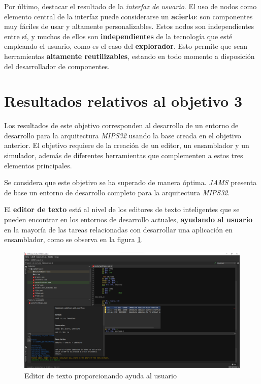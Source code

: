 Por último, destacar el resultado de la \textit{interfaz de usuario}.
El uso de nodos como elemento central de la interfaz puede considerarse
un \textbf{acierto}: son componentes muy fáciles de usar y altamente personalizables.
Estos nodos son independientes entre sí, y muchos de ellos son \textbf{independientes}
de la tecnología que esté empleando el usuario, como es el caso del \textbf{explorador}.
Esto permite que sean herramientas \textbf{altamente reutilizables}, estando en todo
momento a disposición del desarrollador de componentes.


\section{Resultados relativos al objetivo 3}\label{sec:resultados-relativos-al-objetivo-3}

Los resultados de este objetivo corresponden al desarrollo
de un entorno de desarrollo para la arquitectura \textit{MIPS32}
usando la base creada en el objetivo anterior.
El objetivo requiere de la creación de un editor, un ensamblador
y un simulador, además de diferentes herramientas que complementen
a estos tres elementos principales.

Se considera que este objetivo se ha superado
de manera óptima.
\textit{JAMS} presenta de base un entorno de desarrollo completo
para la arquitectura \textit{MIPS32}.

El \textbf{editor de texto} está al nivel de los editores de texto
inteligentes que se pueden encontrar en los entornos de desarrollo
actuales, \textbf{ayudando al usuario} en la mayoría de las tareas
relacionadas con desarrollar una aplicación en ensamblador, como se observa
en la figura \ref{fig:mips-editor}.

\begin{figure}[h]
    \centering
    \includegraphics[width=\textwidth]{images/result/mips-editor}
    \caption{Editor de texto proporcionando ayuda al usuario}
    \label{fig:mips-editor}
\end{figure}


